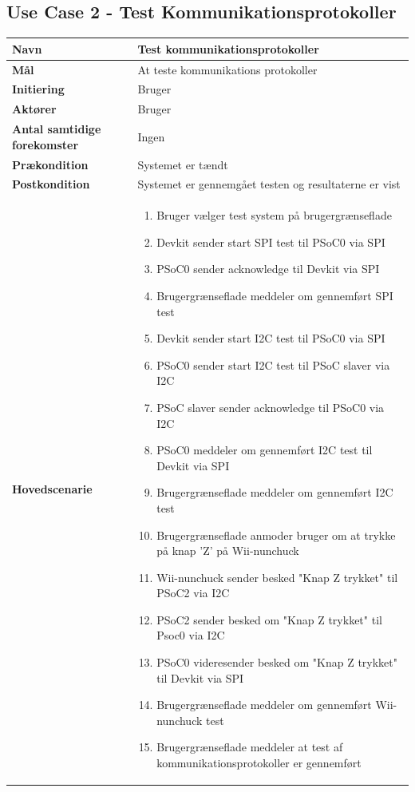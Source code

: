 \subsection{Use Case 2 - Test Kommunikationsprotokoller}
\begin{longtable}{|>{\hspace{0pt}}p{3cm}  |>{\hspace{0pt}}p{9cm}|}
	\hline
	\textbf{Navn} & Test kommunikationsprotokoller\\ \hline
	\textbf{Mål} & At teste kommunikations protokoller \\ \hline
	\textbf{Initiering} & Bruger\\ \hline
	\textbf{Aktører} & Bruger\\ \hline
	\textbf{Antal samtidige forekomster} & Ingen \\ \hline
	\textbf{Prækondition} & Systemet er tændt \\ \hline
	\textbf{Postkondition} &  Systemet er gennemgået testen og resultaterne er vist \\ \hline
	\textbf{Hovedscenarie} & \begin{enumerate}
		\item Bruger vælger test system på brugergrænseflade
		\item Devkit sender start SPI test til PSoC0 via SPI
		\item PSoC0 sender acknowledge til Devkit via SPI
		\subitem[Exception 1: PSoC0 sender ikke acknowledge]
		\item Brugergrænseflade meddeler om gennemført SPI test
		\item Devkit sender start I2C test til PSoC0 via SPI
		\item PSoC0 sender start I2C test til PSoC slaver via I2C
		\item PSoC slaver sender acknowledge til PSoC0 via I2C
		\subitem[Exception 2: PSoC slaver sender ikke acknowledge]
		\item PSoC0 meddeler om gennemført I2C test til Devkit via SPI
		\item Brugergrænseflade meddeler om gennemført I2C test
		\item Brugergrænseflade anmoder bruger om at trykke på knap 'Z' på Wii-nunchuck
		\item Wii-nunchuck sender besked "Knap Z trykket" til PSoC2 via I2C
		\subitem[Exception 3: Wii-nunchuck sender ikke "Knap Z trykket"]
		\item PSoC2 sender besked om "Knap Z trykket" til Psoc0 via I2C
		\item PSoC0 videresender besked om "Knap Z trykket" til Devkit via SPI
		\item Brugergrænseflade meddeler om gennemført Wii-nunchuck test
		\item Brugergrænseflade meddeler at test af kommunikationsprotokoller er gennemført 
		

\end{enumerate}
\end{longtable}
